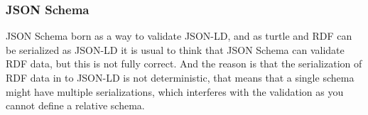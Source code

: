 \subsubsection{JSON Schema}
JSON Schema born as a way to validate JSON-LD, and as turtle and RDF can be serialized as JSON-LD it is usual to think that JSON Schema can validate RDF data, but this is not fully correct. And the reason is that the serialization of RDF data in to JSON-LD is not deterministic, that means that a single schema might have multiple serializations, which interferes with the validation as you cannot define a relative schema.
